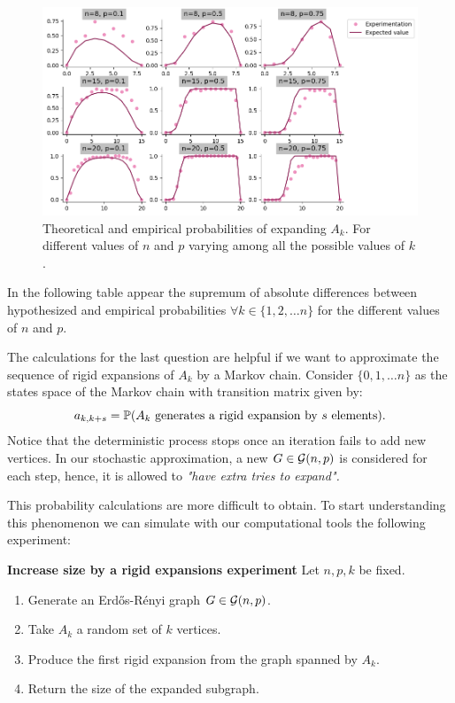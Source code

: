 \begin{figure}[h!]\label{figureExp3}
	\centering
	\includegraphics[scale=0.55]{Python/Figures/Expansion-probability.png}
	\caption{Theoretical and empirical probabilities of expanding $A_{k}$. For different values of $n$ and $p$ varying among all the possible values of $k$.}
\end{figure}

In the following table appear the supremum of absolute differences between hypothesized and empirical probabilities $\forall k \in \{1,2, \dots n\}$ for the different values of $n$ and $p$.

\vspace{0.3cm}

\vspace{-0.3cm}

The calculations for the last question are helpful if we want to approximate the sequence of rigid expansions of $A_{k}$ by a Markov chain. Consider $\{0,1, \dots n\}$ as the states space of the Markov chain with transition matrix given by:
$$ a_{k,k+s} = \P(A_{k} \text{ generates a rigid expansion by } s \text{ elements}).$$
Notice that the deterministic process stops once an iteration fails to add new vertices. In our stochastic approximation, a new $G \in \G(n,p)$ is considered for each step, hence, it is allowed to \textit{"have extra tries to expand".}

This probability calculations are more difficult to obtain. To start understanding this phenomenon we can simulate with our computational tools the following experiment:
 
\begin{cajita}
\textbf{Increase size by a rigid expansions experiment} \hfill \break
Let $n,p,k$ be fixed.
\begin{enumerate}
\item Generate an Erdős-Rényi graph $G\in \G(n,p)$.
\item Take $A_{k}$ a random set of $k$ vertices.
\item Produce the first rigid expansion from the graph spanned by $A_{k}$.
\item Return the size of the expanded subgraph.
\end{enumerate}
\end{cajita}

